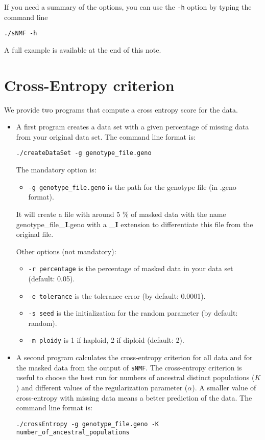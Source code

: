 \documentclass[10pt,a4paper]{article}
\begin{document}
\noindent
If you need a summary of the options, you can use the \verb|-h| option by typing the command line
\footnotesize
\begin{Verbatim}[frame=single]
./sNMF -h
\end{Verbatim}
\noindent
\normalsize

\noindent
A full example is available at the end of this note.

\section{Cross-Entropy criterion}

We provide two programs that compute a cross entropy score for the data.
\begin{itemize}
\item A first program creates a data set with a given percentage of missing data from your original data set.
The command line format is:
\begin{Verbatim}[frame=single]
./createDataSet -g genotype_file.geno
\end{Verbatim}

The mandatory option is:
\begin{itemize}
\item \verb|-g genotype_file.geno| is the path for the genotype file (in .geno format).
\end{itemize}

It will create a file with around 5 \% of masked data with the name genotype\_file{\bf\_I}.geno with a {\bf\_I} extension to differentiate this file from the original file. 

\noindent
Other options (not mandatory):
\begin{itemize}
\item \verb|-r percentage| is the percentage of masked data in your data set (default: 0.05). 
\item \verb|-e tolerance| is the tolerance error (by default: 0.0001). 
\item \verb|-s seed| is the initialization for the random parameter (by default: random). 
\item \verb|-m ploidy| is 1 if haploid, 2 if diploid (default: 2). 
\end{itemize}

\item A second program calculates the cross-entropy criterion for all data and for the masked data from the 
output of {\tt sNMF}. The cross-entropy criterion is useful to choose the best run for numbers of 
ancestral distinct populations ($K$) and different values of the regularization parameter ($\alpha$). 
A smaller value of cross-entropy with missing data means a better prediction of the data.
The command line format is:
\begin{Verbatim}[frame=single]
./crossEntropy -g genotype_file.geno -K number_of_ancestral_populations
\end{Verbatim}


\end{itemize}
\end{document}
